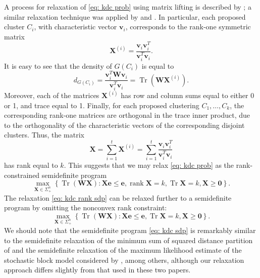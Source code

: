 \documentclass[twoside,11pt]{article}
\DeclareMathOperator{\rank}{{rank}}
\DeclareMathOperator{\tr}{{Tr}}
\newcommand{\e}{\bs {e}}
\newcommand{\bs}{\boldsymbol}
\renewcommand{\v}{\bs{v}}
\newcommand{\X}{\bs {X}}
\newcommand{\W}{\bs {W}}
\newcommand{\0}{\bs{0}}
\newcommand{\bra}[1]{\ensuremath{\left\{ #1 \right\}}} %
\begin{document}
{	%
	 A process for relaxation of \eqref{eq: kdc prob} using matrix lifting is described by \cite{ames2014guaranteed};
	a similar relaxation technique was applied by
	\cite{ames2011nuclear, ames2014convex}
	and \cite{ames2015guaranteed}.
	In particular, each proposed cluster \(C_i\), with characteristic vector \(\v_i\), corresponds to the rank-one symmetric matrix
	\[
	\X^{(i)} =  \frac{ \v_i \v_i^T}{ \v_i^T \v_i}.
	\]
	It is easy to see that the density of \(G(C_i)\) is equal to
	\[
	d_{G(C_i)}= \frac{ \v_i^T \W \v_i }{\v_i^T \v_i }  = \tr( \W \X^{(i)}) .
	\]
	Moreover, each of the matrices \(\X^{(i)}\) has row and column sums equal to either 0 or 1, and trace equal to 1.
	Finally,
	for each proposed clustering \(C_1, \dots, C_k\), the corresponding rank-one matrices are orthogonal in the trace inner
	product, due to the orthogonality of the characteristic vectors of the corresponding disjoint clusters.
	Thus, the matrix
	\begin{equation} \label{eq: cluster X}
	\X = \sum_{i=1}^t \X^{(i)} = \sum_{i=1}^t \frac{ \v_i \v_i^T}{ \v_i^T \v_i}
	\end{equation}
	has rank equal to \(k\).
	This suggests that we may relax \eqref{eq: kdc prob} as the rank-constrained semidefinite program
	\begin{equation} \label{eq: kdc rank sdp}
	\max_{\X \in \Sigma^n_+} \bra{ \tr(\W\X): \X \e \le \e, \rank \X = k, \tr \X = k, \X \ge \0 }.
	\end{equation}
	The relaxation \eqref{eq: kdc rank sdp} can be relaxed further to a semidefinite program
	by omitting the nonconvex rank constraint:
	\begin{equation} \label{eq: kdc sdp}
	\max_{\X \in \Sigma^n_+} \bra{ \tr(\W\X): \X \e \le \e, \tr \X = k, \X \ge \0}.
	\end{equation}
	We should note that the semidefinite program \eqref{eq: kdc sdp} is remarkably similar to the
	semidefinite relaxation of the minimum sum of squared distance partition of \cite{peng2007approximating}
	and the semidefinite relaxation of the maximum likelihood estimate of
	the stochastic block model considered by \cite{amini2014semidefinite}, among others,
	although our relaxation approach differs slightly from that used in these two papers.

}
\end{document}
